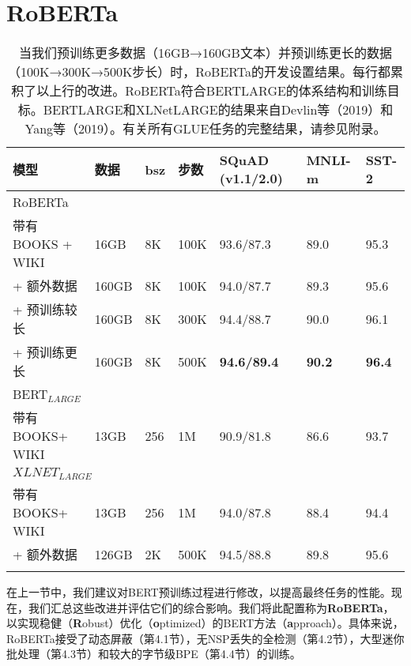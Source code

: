 \documentclass[lang=cn,11pt,a4paper,twocolumn]{elegantpaper}
\begin{document}
\section{RoBERTa}
\begin{table*}[]
  \centering
  \begin{tabular}{lllllll}
  \hline
  \textbf{模型}      & 数据    & \textbf{bsz} & 步数   & \textbf{SQuAD (v1.1/2.0)} & \textbf{MNLI-m} & \textbf{SST-2} \\ \hline
  \multicolumn{7}{l}{RoBERTa}                                                                                   \\
  带有 BOOKS  + WIKI & 16GB  & 8K           & 100K & 93.6/87.3                 & 89.0            & 95.3           \\
  + 额外数据           & 160GB & 8K           & 100K & 94.0/87.7                 & 89.3            & 95.6           \\
  + 预训练较长          & 160GB & 8K           & 300K & 94.4/88.7                 & 90.0            & 96.1           \\
  + 预训练更长          & 160GB & 8K           & 500K & \textbf{94.6/89.4}        & \textbf{90.2}   & \textbf{96.4}  \\ \hline
  \multicolumn{7}{l}{BERT$_{LARGE}$}                                                                            \\
  带有 BOOKS+ WIKI   & 13GB  & 256          & 1M   & 90.9/81.8                 & 86.6            & 93.7           \\
  \multicolumn{7}{l}{$XLNET_{LARGE}$}                                                                           \\
  带有 BOOKS+ WIKI   & 13GB  & 256          & 1M   & 94.0/87.8                 & 88.4            & 94.4           \\
  + 额外数据           & 126GB & 2K           & 500K & 94.5/88.8                 & 89.8            & 95.6           \\ \hline
                   &       &              &      &                           &                 &               
  \end{tabular}
  \caption{当我们预训练更多数据（16GB→160GB文本）并预训练更长的数据（100K→300K→500K步长）时，RoBERTa的开发设置结果。每行都累积了以上行的改进。RoBERTa符合BERTLARGE的体系结构和训练目标。BERTLARGE和XLNetLARGE的结果来自Devlin等（2019）和Yang等（2019）。有关所有GLUE任务的完整结果，请参见附录。}
\end{table*}
在上一节中，我们建议对BERT预训练过程进行修改，以提高最终任务的性能。现在，我们汇总这些改进并评估它们的综合影响。我们将此配置称为\textbf{RoBERTa}，以实现稳健（\textbf{R}obust）优化（\textbf{o}ptimized）的BERT方法（\textbf{a}pproach）。具体来说，RoBERTa接受了动态屏蔽（第4.1节），无NSP丢失的全检测（第4.2节），大型迷你批处理（第4.3节）和较大的字节级BPE（第4.4节）的训练。
\end{document}
